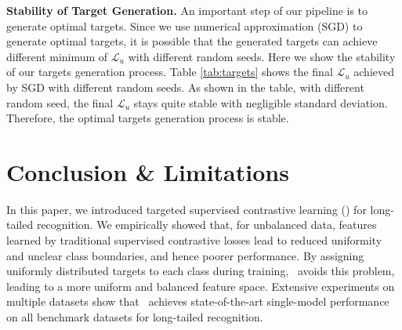 \begin{table}[h]
\caption{$\mathcal{L}_u$ achieved with different random seeds during optimal targets generation for different numbers of classes.}
\vspace{-5mm}
\label{tab:targets}
\begin{center}
\end{center}
\vspace{-10pt}
\end{table}

\textbf{Stability of Target Generation.} An important step of our pipeline is to generate optimal targets. Since we use numerical approximation (SGD) to generate optimal targets, it is possible that the generated targets can achieve different minimum of $\mathcal{L}_u$ with different random seeds. Here we show the stability of our targets generation process. Table \ref{tab:targets} shows the final $\mathcal{L}_u$ achieved by SGD with different random seeds. As shown in the table, with different random seed, the final $\mathcal{L}_u$ stays quite stable with negligible standard deviation. Therefore, the optimal targets generation process is stable.
\section{Conclusion \& Limitations}
In this paper, we introduced targeted supervised contrastive learning (\name) for long-tailed recognition. We empirically showed that, for unbalanced data, features learned by traditional supervised contrastive losses lead to reduced uniformity and unclear class boundaries, and hence poorer performance. By assigning uniformly distributed targets to each class during training, \name~avoids this problem, leading to a more uniform and balanced feature space. Extensive experiments on multiple datasets show that \name\ achieves state-of-the-art single-model performance on all benchmark datasets for long-tailed recognition.

